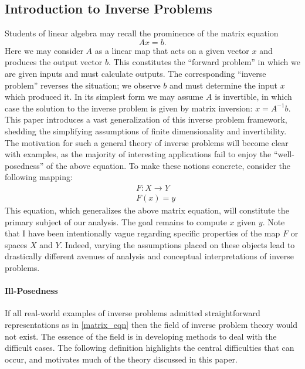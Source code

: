 \documentclass[12pt]{article}
\begin{document}
\subsection*{Introduction to Inverse Problems} 
Students of linear algebra may recall the prominence of the matrix equation
\begin{equation} 
Ax = b. \label{matrix_eqn}
\end{equation}  
Here we may consider $A$ as a linear map 
that acts on a given vector $x$ and produces the output vector $b$. 
This constitutes the ``forward problem'' in which we are given inputs and must 
calculate outputs. The corresponding ``inverse problem'' reverses the situation; we observe 
$b$ and must determine the input $x$ which produced it. In its simplest form we may assume 
$A$ is invertible, in which case the solution to the inverse problem is given by matrix 
inversion: $x = A^{-1}b$. This paper introduces a vast generalization of this inverse 
problem framework, shedding the simplifying assumptions of finite dimensionality
and invertibility. The motivation for such a general theory 
of inverse problems will become clear with examples, as the majority of interesting 
applications fail to enjoy the ``well-posedness'' of the above equation. 
To make these notions concrete, consider the following mapping:
\begin{eqnarray} 
&F: X \to Y \\
&F(x) = y \label{inverse_problem}
\end{eqnarray} 
This equation, which generalizes the above matrix equation, will constitute the primary subject 
of our analysis. The goal remains to compute $x$ given $y$. Note that I have been intentionally 
vague regarding specific properties of the map $F$ or spaces $X$ and $Y$. Indeed, varying the assumptions 
placed on these objects lead to drastically different avenues of analysis and conceptual interpretations
of inverse problems. 

\paragraph{Ill-Posedness}

If all real-world examples of inverse problems admitted straightforward representations as in \ref{matrix_eqn}
then the field of inverse problem theory would not exist. The essence of the field is in developing methods to 
deal with the difficult cases. The following definition highlights the central difficulties that can occur, 
and motivates much of the theory discussed in this paper. 
\end{document}

